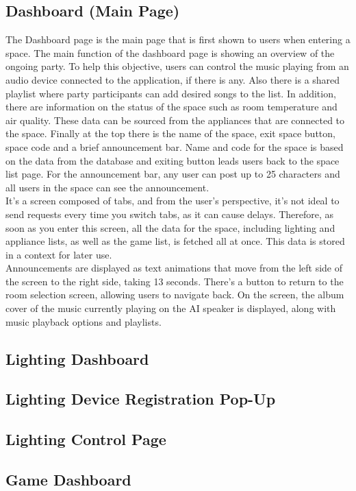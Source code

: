 \documentclass[conference]{IEEEtran}
\begin{document}
    \subsection{Dashboard (Main Page)}
        The Dashboard page is the main page that is first shown to users when entering a space. The main function of the dashboard page is showing an overview of the ongoing party. To help this objective, users can control the music playing from an audio device connected to the application, if there is any. Also there is a shared playlist where party participants can add desired songs to the list. In addition, there are information on the status of the space such as room temperature and air quality. These data can be sourced from the appliances that are connected to the space. Finally at the top there is the name of the space, exit space button, space code and a brief announcement bar. Name and code for the space is based on the data from the database and exiting button leads users back to the space list page. For the announcement bar, any user can post up to 25 characters and all users in the space can see the announcement.\\
        It's a screen composed of tabs, and from the user's perspective, it's not ideal to send requests every time you switch tabs, as it can cause delays. Therefore, as soon as you enter this screen, all the data for the space, including lighting and appliance lists, as well as the game list, is fetched all at once. This data is stored in a context for later use.\\        
        Announcements are displayed as text animations that move from the left side of the screen to the right side, taking 13 seconds. There's a button to return to the room selection screen, allowing users to navigate back. On the screen, the album cover of the music currently playing on the AI speaker is displayed, along with music playback options and playlists.
    \subsection{Lighting Dashboard}
    \subsection{Lighting Device Registration Pop-Up}
    \subsection{Lighting Control Page}
    \subsection{Game Dashboard}
\end{document}
